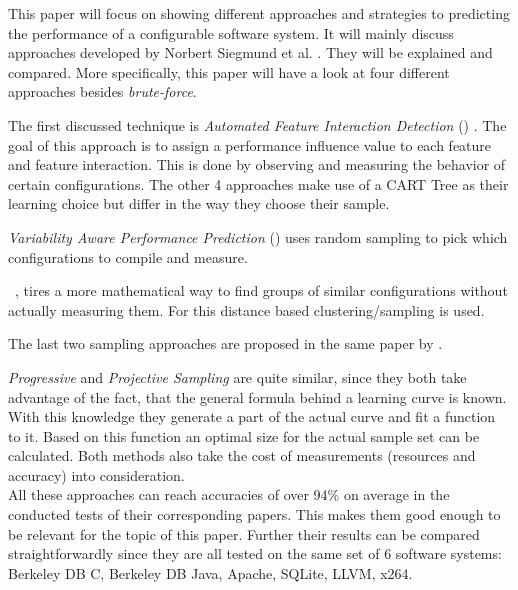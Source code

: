 This paper will focus on showing different approaches and strategies to predicting the performance of a configurable software system. It will mainly discuss approaches developed by Norbert Siegmund et al. \cite{AutomatedFeatureDetectionSiegmund2012,VariabilityAwarePerformancePredictionJianmeiSigmundApel, CostEfficientSampling_Gou_Siegmund_2015, DistanceBasedSampling2019}. They will be explained and compared. More specifically, this paper will have a look at four different approaches besides \textit{brute-force}.

The first discussed technique is \textit{Automated Feature Interaction Detection} (\AFID) \cite{AutomatedFeatureDetectionSiegmund2012}. The goal of this approach is to assign a performance influence value to each feature and feature interaction. This is done by observing and measuring the behavior of certain configurations. 
The other 4 approaches make use of a CART Tree as their learning choice but differ in the way they choose their sample.
 
\textit{Variability Aware Performance Prediction} (\VAPP) \cite{VariabilityAwarePerformancePredictionJianmeiSigmundApel} uses random sampling to pick which configurations to compile and measure. 

\WHAT~\cite{DistanceBasedSampling2019}, tires a more mathematical way to find groups of similar configurations without actually measuring them. For this distance based clustering/sampling is used. 

The last two sampling approaches are proposed in the same paper by \citet{CostEfficientSampling_Gou_Siegmund_2015}. 

\textit{Progressive} and \textit{Projective Sampling} are quite similar, since they both take advantage of the fact, that the general formula behind a learning curve is known. With this knowledge they generate a part of the actual curve and fit a function to it. Based on this function an optimal size for the actual sample set can be calculated. Both methods also take the cost of measurements (resources and accuracy) into consideration.\\
All these approaches can reach accuracies of over 94\% on average in the conducted tests of their corresponding papers. This makes them good enough to be relevant for the topic of this paper. Further their results can be compared straightforwardly since they are all tested on the same set of 6 software systems: Berkeley DB C, Berkeley DB Java, Apache, SQLite, LLVM, x264.